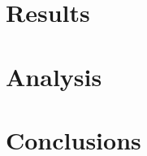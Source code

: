\documentclass[titlepage, letterpaper, 12pt, oneside]{book}
\begin{document}
\section{Results}


\section{Analysis}


\section{Conclusions}


\clearpage

\end{document}
